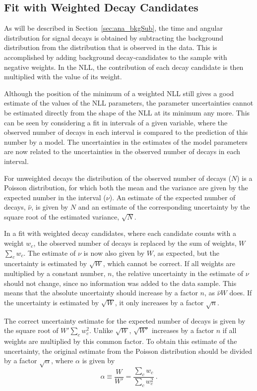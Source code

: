 \subsection{Fit with Weighted Decay Candidates}
\label{subsec:ana_fit_weights}

As will be described in Section~\ref{sec:ana_bkgSub}, the time and angular distribution for \BstoJpsiKK{} signal decays is obtained by
subtracting the background distribution from the distribution that is observed in the data. This is accomplished by adding background
decay-candidates to the sample with negative weights. In the NLL, the contribution of each decay candidate is then multiplied with the
value of its weight.

Although the position of the minimum of a weighted NLL still gives a good estimate of the values of the NLL parameters, the parameter
uncertainties cannot be estimated directly from the shape of the NLL at its minimum any more. This can be seen by considering a fit in
intervals of a given variable, where the observed number of decays in each interval is compared to the prediction of this number by a
model. The uncertainties in the estimates of the model parameters are now related to the uncertainties in the observed number of decays in
each interval.

For unweighted decays the distribution of the observed number of decays ($N$) is a Poisson distribution, for which both the mean and the
variance are given by the expected number in the interval ($\nu$). An estimate of the expected number of decays, $\hat{\nu}$, is given by
$N$ and an estimate of the corresponding uncertainty by the square root of the estimated variance, $\sqrt{N}$.

In a fit with weighted decay candidates, where each candidate counts with a weight $w_c$, the observed number of decays is replaced by the
sum of weights, $W$\textequiv$\sum_c w_c$. The estimate of $\nu$ is now also given by $W$, as expected, but the uncertainty is estimated by
$\sqrt{W}$, which cannot be correct. If all weights are multiplied by a constant number, $n$, the relative uncertainty in the estimate of
$\nu$ should not change, since no information was added to the data sample. This means that the absolute uncertainty should increase by a
factor $n$, as $\hat{\nu}$\texteq$W$ does. If the uncertainty is estimated by $\sqrt{W}$, it only increases by a factor $\sqrt{n}$.

The correct uncertainty estimate for the expected number of decays is given by the square root of $W'$\textequiv$\sum_c w_c^2$. Unlike
$\sqrt{W}$, $\sqrt{W'}$ increases by a factor $n$ if all weights are multiplied by this common factor. To obtain this estimate of the
uncertainty, the original estimate from the Poisson distribution should be divided by a factor $\sqrt{\alpha}$, where $\alpha$ is given by
\begin{equation}
  \alpha \equiv \frac{W}{W'} = \frac{\sum_c w_c}{\sum_c w_c^2} \ .
\end{equation}

